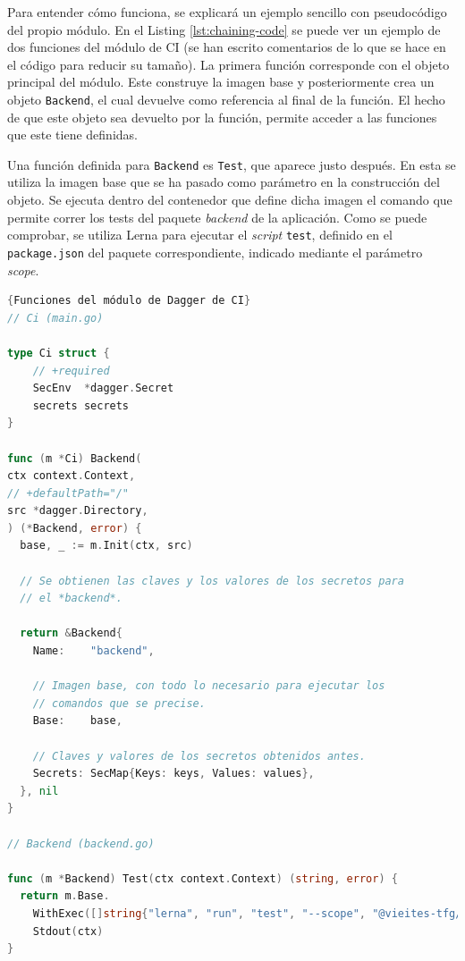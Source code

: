 Para entender cómo funciona, se explicará un ejemplo sencillo con pseudocódigo del propio módulo. En el Listing \ref{lst:chaining-code} se puede ver un ejemplo de dos funciones del módulo de CI (se han escrito comentarios de lo que se hace en el código para reducir su tamaño). La primera función corresponde con el objeto principal del módulo. Este construye la imagen base y posteriormente crea un objeto \texttt{Backend}, el cual devuelve como referencia al final de la función. El hecho de que este objeto sea devuelto por la función, permite acceder a las funciones que este tiene definidas.

Una función definida para \texttt{Backend} es \texttt{Test}, que aparece justo después. En esta se utiliza la imagen base que se ha pasado como parámetro en la construcción del objeto. Se ejecuta dentro del contenedor que define dicha imagen el comando que permite correr los tests del paquete \textit{backend} de la aplicación. Como se puede comprobar, se utiliza Lerna para ejecutar el \textit{script} \texttt{test}, definido en el \texttt{package.json} del paquete correspondiente, indicado mediante el parámetro \textit{scope}.

\begin{lstlisting}[language=go,label=lst:chaining-code]{Funciones del módulo de Dagger de CI}
// Ci (main.go)

type Ci struct {
	// +required
	SecEnv  *dagger.Secret
	secrets secrets
}

func (m *Ci) Backend(
ctx context.Context,
// +defaultPath="/"
src *dagger.Directory,
) (*Backend, error) {
  base, _ := m.Init(ctx, src)

  // Se obtienen las claves y los valores de los secretos para
  // el *backend*.

  return &Backend{
    Name:    "backend",

    // Imagen base, con todo lo necesario para ejecutar los
    // comandos que se precise.
    Base:    base,

    // Claves y valores de los secretos obtenidos antes.
    Secrets: SecMap{Keys: keys, Values: values},
  }, nil
}

// Backend (backend.go)

func (m *Backend) Test(ctx context.Context) (string, error) {
  return m.Base.
    WithExec([]string{"lerna", "run", "test", "--scope", "@vieites-tfg/zoo-backend"}).
    Stdout(ctx)
}

\end{lstlisting}

